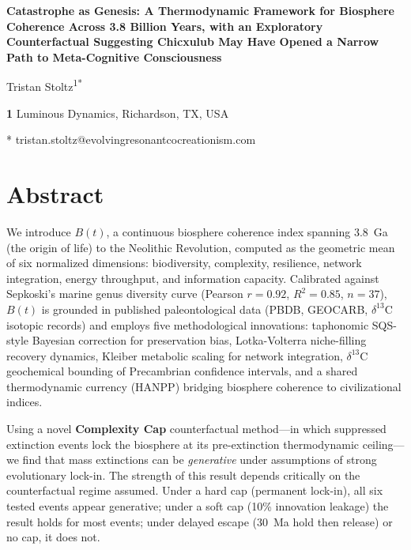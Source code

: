 \documentclass[10pt,letterpaper]{article}
\newcommand{\bt}{$B(t)$}
\begin{document}
\vspace*{0.2in}

\begin{flushleft}
{\Large\textbf{Catastrophe as Genesis: A Thermodynamic Framework for Biosphere Coherence Across 3.8 Billion Years, with an Exploratory Counterfactual Suggesting Chicxulub May Have Opened a Narrow Path to Meta-Cognitive Consciousness}}
\bigskip

Tristan Stoltz\textsuperscript{1*}

\bigskip

\textbf{1} Luminous Dynamics, Richardson, TX, USA

\bigskip

* tristan.stoltz@evolvingresonantcocreationism.com

\end{flushleft}

\section*{Abstract}

We introduce \bt{}, a continuous biosphere coherence index spanning 3.8~Ga
(the origin of life) to the Neolithic Revolution, computed as the geometric
mean of six normalized dimensions: biodiversity, complexity, resilience,
network integration, energy throughput, and information capacity.
Calibrated against Sepkoski's marine genus diversity curve (Pearson $r = 0.92$,
$R^2 = 0.85$, $n = 37$), \bt{} is grounded in published paleontological data
(PBDB, GEOCARB, $\delta^{13}$C isotopic records) and employs five
methodological innovations: taphonomic SQS-style Bayesian correction for
preservation bias, Lotka-Volterra niche-filling recovery dynamics,
Kleiber metabolic scaling for network integration, $\delta^{13}$C geochemical
bounding of Precambrian confidence intervals, and a shared thermodynamic
currency (HANPP) bridging biosphere coherence to civilizational indices.

Using a novel \textbf{Complexity Cap} counterfactual method---in which
suppressed extinction events lock the biosphere at its pre-extinction
thermodynamic ceiling---we find that mass extinctions can be \emph{generative}
under assumptions of strong evolutionary lock-in. The strength of this result
depends critically on the counterfactual regime assumed.
Under a hard cap (permanent lock-in), all six tested events appear generative;
under a soft cap (10\% innovation leakage) the result holds for most events;
under delayed escape (30~Ma hold then release) or no cap, it does not.
\end{document}
